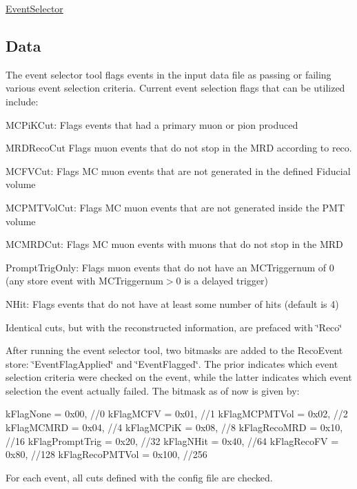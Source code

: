 \hyperlink{classEventSelector}{Event\-Selector}

\subsection*{Data}

The event selector tool flags events in the input data file as passing or failing various event selection criteria. Current event selection flags that can be utilized include\-:
\begin{DoxyItemize}
\item M\-C\-Pi\-K\-Cut\-: Flags events that had a primary muon or pion produced
\item M\-R\-D\-Reco\-Cut Flags muon events that do not stop in the M\-R\-D according to reco.
\item M\-C\-F\-V\-Cut\-: Flags M\-C muon events that are not generated in the defined Fiducial volume
\item M\-C\-P\-M\-T\-Vol\-Cut\-: Flags M\-C muon events that are not generated inside the P\-M\-T volume
\item M\-C\-M\-R\-D\-Cut\-: Flags M\-C muon events with muons that do not stop in the M\-R\-D
\item Prompt\-Trig\-Only\-: Flags muon events that do not have an M\-C\-Triggernum of 0 (any store event with M\-C\-Triggernum$>$0 is a delayed trigger)
\item N\-Hit\-: Flags events that do not have at least some number of hits (default is 4)
\item Identical cuts, but with the reconstructed information, are prefaced with \char`\"{}\-Reco\char`\"{}
\end{DoxyItemize}

After running the event selector tool, two bitmasks are added to the Reco\-Event store\-: \char`\"{}\-Event\-Flag\-Applied\char`\"{} and \char`\"{}\-Event\-Flagged\char`\"{}. The prior indicates which event selection criteria were checked on the event, while the latter indicates which event selection the event actually failed. The bitmask as of now is given by\-:

k\-Flag\-None = 0x00, //0 k\-Flag\-M\-C\-F\-V = 0x01, //1 k\-Flag\-M\-C\-P\-M\-T\-Vol = 0x02, //2 k\-Flag\-M\-C\-M\-R\-D = 0x04, //4 k\-Flag\-M\-C\-Pi\-K = 0x08, //8 k\-Flag\-Reco\-M\-R\-D = 0x10, //16 k\-Flag\-Prompt\-Trig = 0x20, //32 k\-Flag\-N\-Hit = 0x40, //64 k\-Flag\-Reco\-F\-V = 0x80, //128 k\-Flag\-Reco\-P\-M\-T\-Vol = 0x100, //256

For each event, all cuts defined with the config file are checked.

